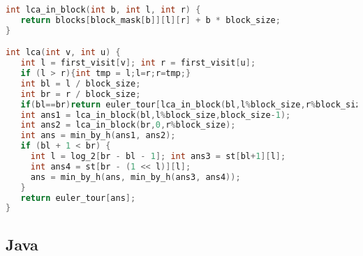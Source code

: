 \begin{lstlisting}[language=C++]
int lca_in_block(int b, int l, int r) {
   return blocks[block_mask[b]][l][r] + b * block_size;
}

int lca(int v, int u) {
   int l = first_visit[v]; int r = first_visit[u];
   if (l > r){int tmp = l;l=r;r=tmp;}
   int bl = l / block_size;
   int br = r / block_size;
   if(bl==br)return euler_tour[lca_in_block(bl,l%block_size,r%block_size)];
   int ans1 = lca_in_block(bl,l%block_size,block_size-1);
   int ans2 = lca_in_block(br,0,r%block_size);
   int ans = min_by_h(ans1, ans2);
   if (bl + 1 < br) {
     int l = log_2[br - bl - 1]; int ans3 = st[bl+1][l];
     int ans4 = st[br - (1 << l)][l];
     ans = min_by_h(ans, min_by_h(ans3, ans4));
   }
   return euler_tour[ans];
}

\end{lstlisting}

\subsection{Java}

